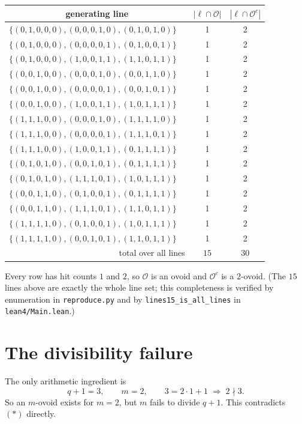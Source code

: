\documentclass[11pt]{article}
\theoremstyle{definition}
\theoremstyle{remark}
\newcommand{\ov}{\mathcal{O}}
\begin{document}
\begin{center}
\footnotesize
\begin{tabular}{llcc}
\toprule
\multicolumn{2}{c}{generating line} & $|\ell \cap \ov|$ & $|\ell \cap \ov^{c}|$ \\
\midrule
$\{(0,1,0,0,0),(0,0,0,1,0),(0,1,0,1,0)\}$ & & 1 & 2 \\
$\{(0,1,0,0,0),(0,0,0,0,1),(0,1,0,0,1)\}$ & & 1 & 2 \\
$\{(0,1,0,0,0),(1,0,0,1,1),(1,1,0,1,1)\}$ & & 1 & 2 \\
$\{(0,0,1,0,0),(0,0,0,1,0),(0,0,1,1,0)\}$ & & 1 & 2 \\
$\{(0,0,1,0,0),(0,0,0,0,1),(0,0,1,0,1)\}$ & & 1 & 2 \\
$\{(0,0,1,0,0),(1,0,0,1,1),(1,0,1,1,1)\}$ & & 1 & 2 \\
$\{(1,1,1,0,0),(0,0,0,1,0),(1,1,1,1,0)\}$ & & 1 & 2 \\
$\{(1,1,1,0,0),(0,0,0,0,1),(1,1,1,0,1)\}$ & & 1 & 2 \\
$\{(1,1,1,0,0),(1,0,0,1,1),(0,1,1,1,1)\}$ & & 1 & 2 \\
$\{(0,1,0,1,0),(0,0,1,0,1),(0,1,1,1,1)\}$ & & 1 & 2 \\
$\{(0,1,0,1,0),(1,1,1,0,1),(1,0,1,1,1)\}$ & & 1 & 2 \\
$\{(0,0,1,1,0),(0,1,0,0,1),(0,1,1,1,1)\}$ & & 1 & 2 \\
$\{(0,0,1,1,0),(1,1,1,0,1),(1,1,0,1,1)\}$ & & 1 & 2 \\
$\{(1,1,1,1,0),(0,1,0,0,1),(1,0,1,1,1)\}$ & & 1 & 2 \\
$\{(1,1,1,1,0),(0,0,1,0,1),(1,1,0,1,1)\}$ & & 1 & 2 \\
\midrule
\multicolumn{2}{r}{total over all lines} & $15$ & $30$ \\
\bottomrule
\end{tabular}
\end{center}

Every row has hit counts $1$ and $2$, so $\ov$ is an ovoid and $\ov^{c}$ is a
$2$-ovoid. (The $15$ lines above are exactly the whole line set; this
completeness is verified by enumeration in \texttt{reproduce.py} and by
\texttt{lines15\_is\_all\_lines} in \texttt{lean4/Main.lean}.)

\section{The divisibility failure}

The only arithmetic ingredient is
\[
q+1 = 3, \qquad m = 2, \qquad 3 = 2 \cdot 1 + 1 \;\Longrightarrow\; 2 \nmid 3 .
\]
So an $m$-ovoid exists for $m=2$, but $m$ fails to divide $q+1$. This
contradicts $(\ast)$ directly.
\end{document}
